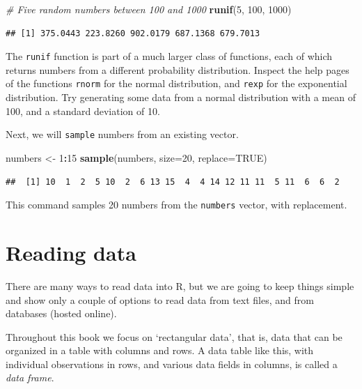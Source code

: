 \documentclass[]{book}
\newenvironment{Shaded}{\begin{snugshade}}{\end{snugshade}}
\newcommand{\CommentTok}[1]{\textcolor[rgb]{0.56,0.35,0.01}{\textit{#1}}}
\newcommand{\DataTypeTok}[1]{\textcolor[rgb]{0.13,0.29,0.53}{#1}}
\newcommand{\DecValTok}[1]{\textcolor[rgb]{0.00,0.00,0.81}{#1}}
\newcommand{\KeywordTok}[1]{\textcolor[rgb]{0.13,0.29,0.53}{\textbf{#1}}}
\newcommand{\NormalTok}[1]{#1}
\newcommand{\OperatorTok}[1]{\textcolor[rgb]{0.81,0.36,0.00}{\textbf{#1}}}
\newcommand{\OtherTok}[1]{\textcolor[rgb]{0.56,0.35,0.01}{#1}}
\newcommand{\StringTok}[1]{\textcolor[rgb]{0.31,0.60,0.02}{#1}}
\let\BeginKnitrBlock\begin \let\EndKnitrBlock\end
\begin{document}
\begin{Shaded}
\begin{Highlighting}[]
\CommentTok{# Five random numbers between 100 and 1000}
\KeywordTok{runif}\NormalTok{(}\DecValTok{5}\NormalTok{, }\DecValTok{100}\NormalTok{, }\DecValTok{1000}\NormalTok{)}
\end{Highlighting}
\end{Shaded}

\begin{verbatim}
## [1] 375.0443 223.8260 902.0179 687.1368 679.7013
\end{verbatim}

\BeginKnitrBlock{rmdtry}
The \texttt{runif} function is part of a much larger class of functions, each of which returns
numbers from a different probability distribution. Inspect the help pages of the functions \texttt{rnorm}
for the normal distribution, and \texttt{rexp} for the exponential distribution. Try generating some data from a normal distribution with a mean of 100, and a standard deviation of 10.
\EndKnitrBlock{rmdtry}

Next, we will \texttt{sample} numbers from an existing vector.

\begin{Shaded}
\begin{Highlighting}[]
\NormalTok{numbers <-}\StringTok{ }\DecValTok{1}\OperatorTok{:}\DecValTok{15}
\KeywordTok{sample}\NormalTok{(numbers, }\DataTypeTok{size=}\DecValTok{20}\NormalTok{, }\DataTypeTok{replace=}\OtherTok{TRUE}\NormalTok{)}
\end{Highlighting}
\end{Shaded}

\begin{verbatim}
##  [1] 10  1  2  5 10  2  6 13 15  4  4 14 12 11 11  5 11  6  6  2
\end{verbatim}

This command samples 20 numbers from the \texttt{numbers} vector, with replacement.

\hypertarget{readingdata}{%
\section{Reading data}\label{readingdata}}

There are many ways to read data into R, but we are going to keep things simple and show only a couple of options to read data from text files, and from databases (hosted online).

Throughout this book we focus on `rectangular data', that is, data that can be organized in a table with columns and rows. A data table like this, with individual observations in rows, and various data fields in columns, is called a \emph{data frame}.
\end{document}
